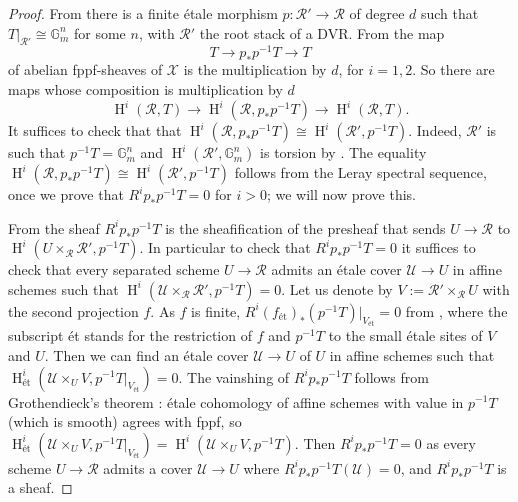 \documentclass{amsart}
\theoremstyle{definition}
\newcommand{\bG}{\mathbb{G}}
\newcommand{\cX}{\mathcal{X}}
\newcommand{\cU}{\mathcal{U}}
\newcommand{\oH}{\operatorname{H}}
\newcommand{\cR}{\mathcal{R}}
\begin{document}
\begin{proof}
 From  there is a finite \'etale morphism $p:\cR'\to \cR$ of degree $d$ such that $T|_{\cR'}\cong \bG_m^n$ for some $n$, with $\cR'$ the root stack of a DVR.
 From  the map $$T\to p_*p^{-1}T\to T$$ of abelian fppf-sheaves of $\cX$
is the multiplication by $d$, for $i=1,2$. 
So there are maps whose composition is multiplication by $d$ \[
\oH^{i}(\cR,T)\to \oH^{i}(\cR,p_*p^{-1}T)\to \oH^{i}(\cR,T).
\] It suffices to check that  that $\oH^{i}(\cR,p_*p^{-1}T)\cong \oH^{i}(\cR',p^{-1}T)$. Indeed, $\cR'$ is such that $p^{-1}T=\bG_m^n$ and $\oH^{i}(\cR',\bG_m^n)$ is torsion by .
The equality $\oH^{i}(\cR,p_*p^{-1}T)\cong \oH^{i}(\cR',p^{-1}T)$ follows from the Leray spectral sequence, once we prove that $R^ip_*p^{-1}T=0$ for $i>0$; we will now prove this.

From \cite[\href{https://stacks.math.columbia.edu/tag/0GR2}{Tag 0GR2}]{stacks-project} the sheaf $R^ip_*p^{-1}T$ is the sheafification of the presheaf that sends $U\to \cR$ to $\oH^i(U\times_\cR\cR',p^{-1}T)$. In particular to check that $R^ip_*p^{-1}T=0$ it suffices to check that every separated scheme $U\to \cR$ admits an \'
etale cover $\cU\to U$ in affine schemes such that 
$\oH^i(\cU\times_\cR\cR',p^{-1}T)=0$. Let us denote by $V:=\cR'\times_\cR U$ with the second projection $f$. As $f$ is finite, $R^i(f_{\text{\'et}})_*(p^{-1}T)|_{V_{\text{\'et}}}=0$ from \cite[\href{https://stacks.math.columbia.edu/tag/0A4K}{Tag 0A4K}]{stacks-project}, where the subscript \'et stands for the restriction of $f$ and $p^{-1}T$ to the small \'etale sites of $V$ and $U$. 
Then we can find an \'etale cover $\cU\to U$ of $U$ in affine schemes such that $\oH^i_{\text{\'et}}(\cU\times_U V,p^{-1}T|_{V_{\text{\'et}}})=0$.
The vainshing of $R^ip_*p^{-1}T$ follows from Grothendieck's theorem \cite[Theorem 11.7]{MR244270}: \'etale cohomology of affine schemes with value in $p^{-1}T$ (which is smooth) agrees with fppf, so $\oH^i_{\text{\'et}}(\cU\times_U V,p^{-1}T|_{V_{\text{\'et}}}) = \oH^i(\cU\times_U V,p^{-1}T)$. Then $R^ip_*p^{-1}T=0$ as every scheme $U\to \cR$ admits a cover $\cU\to U$ where $R^ip_*p^{-1}T(\cU)=0$, and $R^ip_*p^{-1}T$ is a sheaf. 
\end{proof}
    
\end{document}
